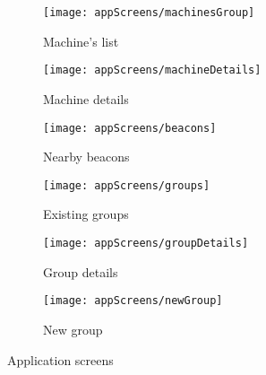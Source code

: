 \begin{figure}[H]
	\centering
	\begin{subfigure}[t]{0.3\textwidth}
		\centering	
		\texttt{[image: appScreens/machinesGroup]}
		\caption{Machine's list}
		\label{subfig:machinesList}
	\end{subfigure}%
	\begin{subfigure}[t]{0.3\textwidth}
		\centering	
		\texttt{[image: appScreens/machineDetails]}
		\caption{Machine details}
		\label{subfig:machineDetails}
	\end{subfigure}
	\begin{subfigure}[t]{0.3\textwidth}
		\centering	
		\texttt{[image: appScreens/beacons]}
		\caption{Nearby beacons}
		\label{subfig:nearbyBeacons}
	\end{subfigure}
	\begin{subfigure}[t]{0.3\textwidth}
		\centering	
		\texttt{[image: appScreens/groups]}
		\caption{Existing groups}
		\label{subfig:existingGroups}
	\end{subfigure}
	\begin{subfigure}[t]{0.3\textwidth}
		\centering	
		\texttt{[image: appScreens/groupDetails]}
		\caption{Group details}
		\label{subfig:groupDetails}
	\end{subfigure}
	\begin{subfigure}[t]{0.3\textwidth}
		\centering	
		\texttt{[image: appScreens/newGroup]}
		\caption{New group}
		\label{subfig:newGroup}
	\end{subfigure}

	\caption{Application screens}
	\label{fig:appScreens}

\end{figure}

